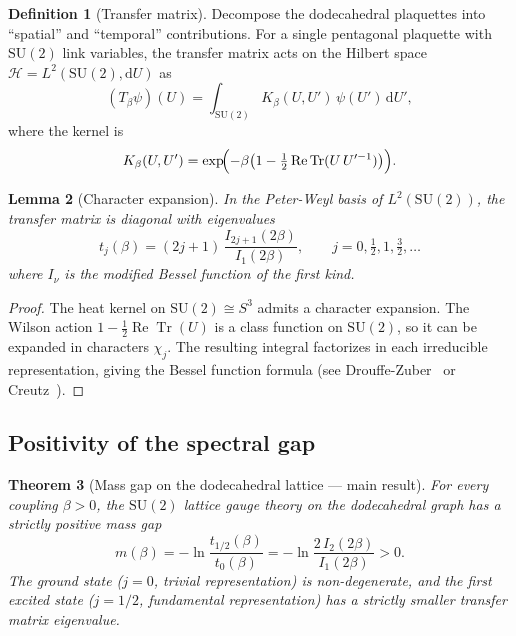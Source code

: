 \documentclass[12pt,a4paper]{article}
\newtheorem{theorem}{Theorem}[section]
\newtheorem{lemma}[theorem]{Lemma}
\theoremstyle{definition}
\newtheorem{definition}[theorem]{Definition}
\theoremstyle{remark}
\newcommand{\SU}{\mathrm{SU}}
\newcommand{\Tr}{\operatorname{Tr}}
\newcommand{\Hilb}{\mathcal{H}}
\begin{document}
\begin{definition}[Transfer matrix]\label{def:transfer}
Decompose the dodecahedral plaquettes into ``spatial'' and ``temporal''
contributions.  For a single pentagonal plaquette with $\SU(2)$ link
variables, the transfer matrix acts on the Hilbert space
$\Hilb = L^2(\SU(2), \mathrm{d}U)$ as
\begin{equation}\label{eq:transfer}
  (T_\beta \psi)(U) = \int_{\SU(2)} K_\beta(U, U')\, \psi(U')\, \mathrm{d}U',
\end{equation}
where the kernel is
\begin{equation}\label{eq:kernel}
  K_\beta(U, U') = \exp\!\Bigl(-\beta\bigl(1 - \tfrac{1}{2}\operatorname{Re}\Tr(U\, U'^{-1})\bigr)\Bigr).
\end{equation}
\end{definition}

\begin{lemma}[Character expansion]\label{lem:character}
In the Peter-Weyl basis of $L^2(\SU(2))$, the transfer matrix is
diagonal with eigenvalues
\begin{equation}\label{eq:charexp}
  t_j(\beta) = (2j+1)\,\frac{I_{2j+1}(2\beta)}{I_1(2\beta)},
  \qquad j = 0, \tfrac{1}{2}, 1, \tfrac{3}{2}, \ldots
\end{equation}
where $I_\nu$ is the modified Bessel function of the first kind.
\end{lemma}

\begin{proof}
The heat kernel on $\SU(2) \cong S^3$ admits a character expansion.  The
Wilson action $1 - \frac{1}{2}\operatorname{Re}\Tr(U)$ is a class
function on $\SU(2)$, so it can be expanded in characters $\chi_j$.
The resulting integral factorizes in each irreducible representation,
giving the Bessel function formula
(see Drouffe-Zuber~\cite{drouffezuber1983} or
Creutz~\cite{creutz1983}).
\end{proof}

\subsection{Positivity of the spectral gap}\label{ssec:gap}

\begin{theorem}[Mass gap on the dodecahedral lattice --- main result]%
\label{thm:massgap}
For every coupling $\beta > 0$, the $\SU(2)$ lattice gauge theory on the
dodecahedral graph has a strictly positive mass gap
\begin{equation}\label{eq:massgap}
  m(\beta) = -\ln\!\frac{t_{1/2}(\beta)}{t_0(\beta)}
  = -\ln\!\frac{2\,I_2(2\beta)}{I_1(2\beta)} > 0.
\end{equation}
The ground state ($j=0$, trivial representation) is non-degenerate, and
the first excited state ($j = 1/2$, fundamental representation) has a
strictly smaller transfer matrix eigenvalue.
\end{theorem}
\end{document}
